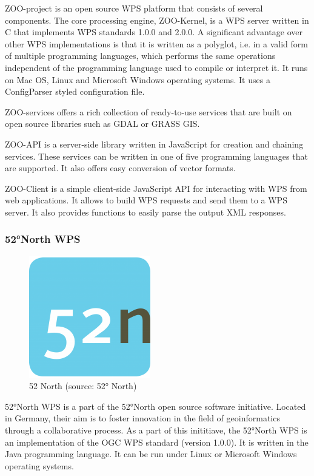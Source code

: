 ZOO-project is an open source WPS platform that consists of several components. The core processing engine, ZOO-Kernel, is a WPS server written in C that implements WPS standards 1.0.0 and 2.0.0.\cite{zoo} A significant advantage over other WPS implementations is that it is written as a polyglot, i.e. in a valid form of multiple programming languages, which performs the same operations independent of the programming language used to compile or interpret it.\cite{polyglot} It runs on Mac OS, Linux and Microsoft Windows operating systems. It uses a ConfigParser styled configuration file.

ZOO-services offers a rich collection of ready-to-use services that are built on open source libraries such as GDAL or GRASS GIS. 

ZOO-API is a server-side library written in JavaScript for creation and chaining services. These services can be written in one of five programming languages that are supported. It also offers easy conversion of vector formats. 

ZOO-Client is a simple client-side JavaScript API for interacting with WPS from web applications. It allows to build WPS requests and send them to a WPS server. It also provides functions to easily parse the output XML responses.


\subsubsection{52°North WPS}
\begin{figure}[H] \centering
      \includegraphics[width=150pt]{./pictures/52n.png}
      \caption[52° North logo]{52 North (source: 52° North)}
      \label{fig:52 North}
  \end{figure}

52°North WPS is a part of the 52°North open source software initiative. Located in Germany, their aim is to foster innovation in the field of geoinformatics through a collaborative process. As a part of this inititiave, the 52°North WPS is an implementation of the OGC WPS standard (version 1.0.0). It is written in the Java programming language. It can be run under Linux or Microsoft Windows operating systems. 

